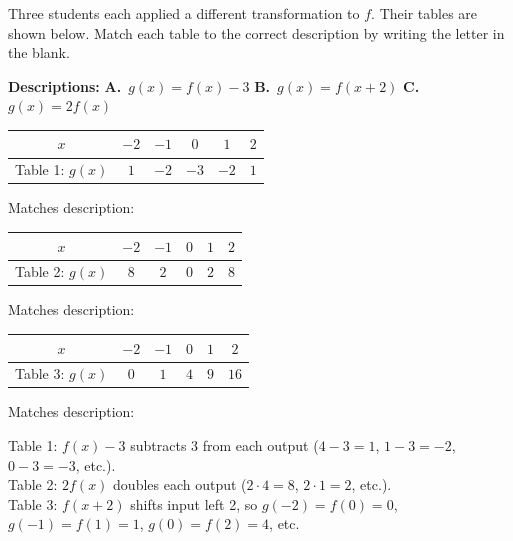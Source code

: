 \documentclass[10pt]{article}
\begin{document}
\begin{tcolorbox}[colback=white, colframe=black!40,
    title=\textbf{Tier R --- Remediate},
    fonttitle=\bfseries, arc=2mm, left=3mm, right=3mm, top=2mm, bottom=2mm]

Three students each applied a different transformation to $f$. Their tables are shown below.
Match each table to the correct description by writing the letter in the blank.

\medskip
\textbf{Descriptions:} \quad
\textbf{A.}\ $g(x) = f(x) - 3$ \qquad
\textbf{B.}\ $g(x) = f(x+2)$ \qquad
\textbf{C.}\ $g(x) = 2f(x)$

\medskip
\renewcommand{\arraystretch}{1.25}
\begin{tabular}{|c|c|c|c|c|c|}
\hline
$x$    & $-2$ & $-1$ & $0$ & $1$ & $2$ \\
\hline
Table 1: $g(x)$ & $1$ & $-2$ & $-3$ & $-2$ & $1$ \\
\hline
\end{tabular}
\quad Matches description: 

\medskip
\begin{tabular}{|c|c|c|c|c|c|}
\hline
$x$    & $-2$ & $-1$ & $0$ & $1$ & $2$ \\
\hline
Table 2: $g(x)$ & $8$ & $2$ & $0$ & $2$ & $8$ \\
\hline
\end{tabular}
\quad Matches description: 

\medskip
\begin{tabular}{|c|c|c|c|c|c|}
\hline
$x$    & $-2$ & $-1$ & $0$ & $1$ & $2$ \\
\hline
Table 3: $g(x)$ & $0$ & $1$ & $4$ & $9$ & $16$ \\
\hline
\end{tabular}
\quad Matches description: 

\begin{teachernote}
Table 1: $f(x)-3$ subtracts 3 from each output ($4-3=1$, $1-3=-2$, $0-3=-3$, etc.). \\
Table 2: $2f(x)$ doubles each output ($2\cdot4=8$, $2\cdot1=2$, etc.). \\
Table 3: $f(x+2)$ shifts input left 2, so $g(-2)=f(0)=0$, $g(-1)=f(1)=1$, $g(0)=f(2)=4$, etc.
\end{teachernote}

\end{tcolorbox}

\vspace{0.08in}
\end{document}

